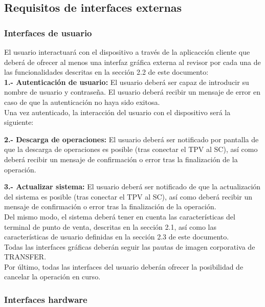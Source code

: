 \subsection{Requisitos de interfaces externas}

\subsubsection{Interfaces de usuario}

El usuario interactuará con el dispositivo a través de la aplicacción cliente que deberá de ofrecer al menos una interfaz gráfica externa al revisor por cada una de las funcionalidades descritas en la sección 2.2 de este documento:\\

\textbf{1.- Autenticación de usuario:} El usuario deberá ser capaz de introducir su nombre de usuario y contraseña. El usuario deberá recibir un mensaje de error en caso de que la autenticación no haya sido exitosa.\\

Una vez autenticado, la interacción del usuario con el dispositivo será la siguiente:

\textbf{2.- Descarga de operaciones:} El usuario deberá ser notificado por pantalla de que la descarga de operaciones es posible (tras conectar el TPV al SC), así como deberá recibir un mensaje de confirmación o error tras la finalización de la operación.

\textbf{3.- Actualizar sistema:} El usuario deberá ser notificado de que la actualización del sistema es posible (tras conectar el TPV al SC), así como deberá recibir un mensaje de confirmación o error tras la finalización de la operación.\\

Del mismo modo, el sistema deberá tener en cuenta las características del terminal de punto de venta, descritas en la sección 2.1, así como las características de usuario definidas en la sección 2.3 de este documento.\\

Todas las interfaces gráficas deberán seguir las pautas de imagen corporativa de TRANSFER.\\

Por último, todas las interfaces del usuario deberán ofrecer la posibilidad de cancelar la operación en curso.\\

\subsubsection{Interfaces hardware}

